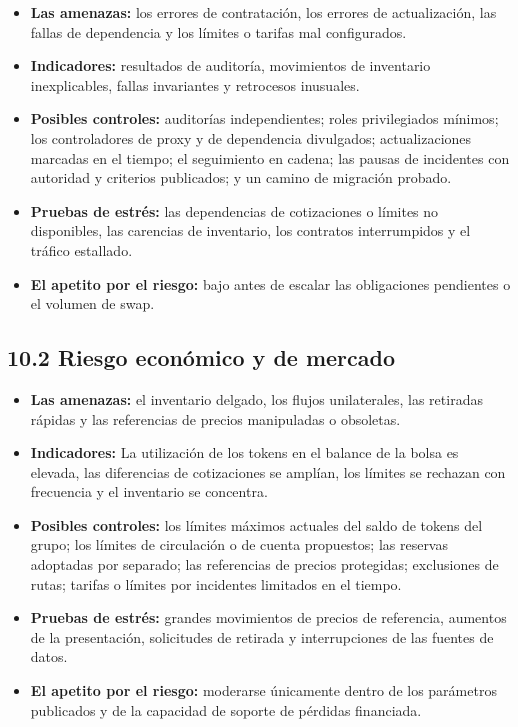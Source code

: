 \documentclass[11pt]{article}
\begin{document}
\begin{itemize}[leftmargin=*]
\item \textbf{Las amenazas:} los errores de contratación, los errores de actualización, las fallas de dependencia y los límites o tarifas mal configurados.
\item \textbf{Indicadores:} resultados de auditoría, movimientos de inventario inexplicables, fallas invariantes y retrocesos inusuales.
\item \textbf{Posibles controles:} auditorías independientes; roles privilegiados mínimos; los controladores de proxy y de dependencia divulgados; actualizaciones marcadas en el tiempo; el seguimiento en cadena; las pausas de incidentes con autoridad y criterios publicados; y un camino de migración probado.
\item \textbf{Pruebas de estrés:} las dependencias de cotizaciones o límites no disponibles, las carencias de inventario, los contratos interrumpidos y el tráfico estallado.
\item \textbf{El apetito por el riesgo:} bajo antes de escalar las obligaciones pendientes o el volumen de swap.
\end{itemize}
\subsection*{10.2 Riesgo económico y de mercado}

\begin{itemize}[leftmargin=*]
\item \textbf{Las amenazas:} el inventario delgado, los flujos unilaterales, las retiradas rápidas y las referencias de precios manipuladas o obsoletas.
\item \textbf{Indicadores:} La utilización de los tokens en el balance de la bolsa es elevada, las diferencias de cotizaciones se amplían, los límites se rechazan con frecuencia y el inventario se concentra.
\item \textbf{Posibles controles:} los límites máximos actuales del saldo de tokens del grupo; los límites de circulación o de cuenta propuestos; las reservas adoptadas por separado; las referencias de precios protegidas; exclusiones de rutas; tarifas o límites por incidentes limitados en el tiempo.
\item \textbf{Pruebas de estrés:} grandes movimientos de precios de referencia, aumentos de la presentación, solicitudes de retirada y interrupciones de las fuentes de datos.
\item \textbf{El apetito por el riesgo:} moderarse únicamente dentro de los parámetros publicados y de la capacidad de soporte de pérdidas financiada.
\end{itemize}
\end{document}
